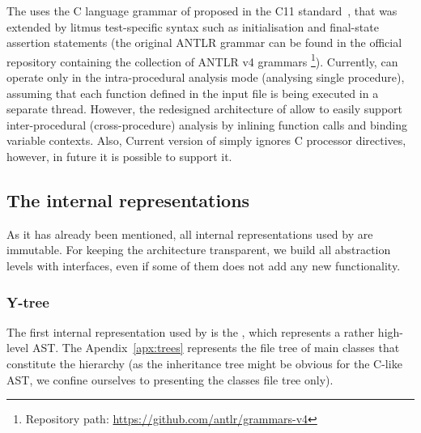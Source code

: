 The \porthos[2] uses the C language grammar of proposed in the C11 standard~\cite{jtc2011sc22}, that was extended by litmus test-specific syntax such as initialisation and final-state assertion statements (the original ANTLR grammar can be found in the official repository containing the collection of ANTLR v4 grammars%
\footnote{Repository path: \url{https://github.com/antlr/grammars-v4}}).%
Currently, \porthos[2] can operate only in the intra-procedural analysis mode (analysing single procedure), assuming that each function defined in the input file is being executed in a separate thread.
However, the redesigned architecture of \porthos[2] allow to easily support inter-procedural (cross-procedure) analysis by inlining function calls and binding variable contexts.
Also, Current version of \porthos[2] simply ignores C processor directives, however, in future it is possible to support it.



\subsection{The internal representations}
\label{ch:impl:model}

As it has already been mentioned, all internal representations used by \porthos[2] are immutable.
For keeping the architecture transparent, we build all abstraction levels with interfaces, even if some of them does not add any new functionality.%

\subsubsection{Y-tree}
\label{ch:impl:model:ytree}

The first internal representation used by \porthos[2] is the \textit{\ytree{}}, which represents a rather high-level AST.
The Apendix~\ref{apx:trees} represents the file tree of main classes that constitute the \ytree{} hierarchy (as the inheritance tree might be obvious for the C-like AST, we confine ourselves to presenting the classes file tree only).

